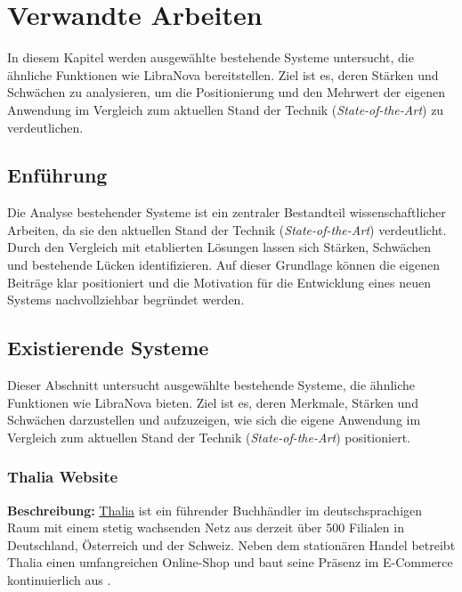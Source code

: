 \chapter{Verwandte Arbeiten}

In diesem Kapitel werden ausgewählte bestehende Systeme untersucht, die ähnliche Funktionen wie LibraNova bereitstellen. Ziel ist es, deren Stärken und Schwächen zu analysieren, um die Positionierung und den Mehrwert der eigenen Anwendung im Vergleich zum aktuellen Stand der Technik (\emph{State-of-the-Art}) zu verdeutlichen.


\section{Enführung}

Die Analyse bestehender Systeme ist ein zentraler Bestandteil wissenschaftlicher Arbeiten, da sie den aktuellen Stand der Technik (\emph{State-of-the-Art}) verdeutlicht. Durch den Vergleich mit etablierten Lösungen lassen sich Stärken, Schwächen und bestehende Lücken identifizieren. Auf dieser Grundlage können die eigenen Beiträge klar positioniert und die Motivation für die Entwicklung eines neuen Systems nachvollziehbar begründet werden.


\section{Existierende Systeme}

Dieser Abschnitt untersucht ausgewählte bestehende Systeme, die ähnliche Funktionen wie LibraNova bieten. Ziel ist es, deren Merkmale, Stärken und Schwächen darzustellen und aufzuzeigen, wie sich die eigene Anwendung im Vergleich zum aktuellen Stand der Technik (\emph{State-of-the-Art}) positioniert.

\subsection{Thalia Website}

\textbf{Beschreibung:} \href{https://www.thalia.de/}{Thalia} ist ein führender Buchhändler im deutschsprachigen Raum mit einem stetig wachsenden Netz aus derzeit über 500 Filialen in Deutschland, Österreich und der Schweiz. Neben dem stationären Handel betreibt Thalia einen umfangreichen Online-Shop und baut seine Präsenz im E-Commerce kontinuierlich aus \cite{thaliaUnternehmen2025a}.

